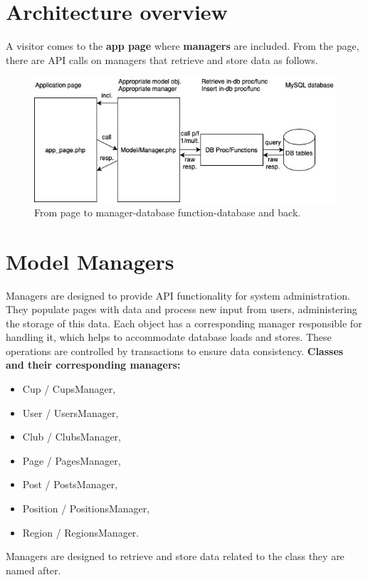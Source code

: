 \section{Architecture overview}
A visitor comes to the \textbf{app page} where \textbf{managers} are included. From the page, there are API calls on managers that retrieve and store data as follows.
\newline
\begin{figure}[h]	
	\centering	
    \includegraphics[scale=0.707]{img/app-schema.jpg}
	\caption{From page to manager-database function-database and back.}
	\label{fig2.1:appschema}
\end{figure}
\section{Model Managers}
Managers are designed to provide API functionality for system administration. They populate pages with data and process new input from users, administering the storage of this data. Each object has a corresponding manager responsible for handling it, which helps to accommodate database loads and stores. These operations are controlled by transactions to ensure data consistency.
\newline
\textbf{Classes and their corresponding managers:}
\begin{itemize}
    \item Cup / CupsManager,
    \item User / UsersManager,
    \item Club / ClubsManager,
    \item Page / PagesManager,
    \item Post / PostsManager,
    \item Position / PositionsManager,
    \item Region / RegionsManager.
\end{itemize}
Managers are designed to retrieve and store data related to the class they are named after.
\newpage
